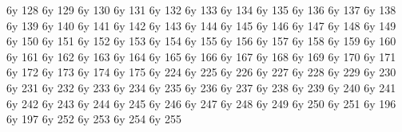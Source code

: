 \characterdef \CYRA           6y  128
\characterdef \CYRB           6y  129
\characterdef \CYRV           6y  130
\characterdef \CYRG           6y  131
\characterdef \CYRD           6y  132
\characterdef \CYRE           6y  133
\characterdef \CYRZH          6y  134
\characterdef \CYRZ           6y  135
\characterdef \CYRI           6y  136
\characterdef \CYRISHRT       6y  137
\characterdef \CYRK           6y  138
\characterdef \CYRL           6y  139
\characterdef \CYRM           6y  140
\characterdef \CYRN           6y  141
\characterdef \CYRO           6y  142
\characterdef \CYRP           6y  143
\characterdef \CYRR           6y  144
\characterdef \CYRS           6y  145
\characterdef \CYRT           6y  146
\characterdef \CYRU           6y  147
\characterdef \CYRF           6y  148
\characterdef \CYRH           6y  149
\characterdef \CYRC           6y  150
\characterdef \CYRCH          6y  151
\characterdef \CYRSH          6y  152
\characterdef \CYRSHCH        6y  153
\characterdef \CYRHRDSN       6y  154
\characterdef \CYRERY         6y  155
\characterdef \CYRSFTSN       6y  156
\characterdef \CYREREV        6y  157
\characterdef \CYRYU          6y  158
\characterdef \CYRYA          6y  159
\characterdef \cyra           6y  160
\characterdef \cyrb           6y  161
\characterdef \cyrv           6y  162
\characterdef \cyrg           6y  163
\characterdef \cyrd           6y  164
\characterdef \cyre           6y  165
\characterdef \cyrzh          6y  166
\characterdef \cyrz           6y  167
\characterdef \cyri           6y  168
\characterdef \cyrishrt       6y  169
\characterdef \cyrk           6y  170
\characterdef \cyrl           6y  171
\characterdef \cyrm           6y  172
\characterdef \cyrn           6y  173
\characterdef \cyro           6y  174
\characterdef \cyrp           6y  175
\characterdef \cyrr           6y  224
\characterdef \cyrs           6y  225
\characterdef \cyrt           6y  226
\characterdef \cyru           6y  227
\characterdef \cyrf           6y  228
\characterdef \cyrh           6y  229
\characterdef \cyrc           6y  230
\characterdef \cyrch          6y  231
\characterdef \cyrsh          6y  232
\characterdef \cyrshch        6y  233
\characterdef \cyrhrdsn       6y  234
\characterdef \cyrery         6y  235
\characterdef \cyrsftsn       6y  236
\characterdef \cyrerev        6y  237
\characterdef \cyryu          6y  238
\characterdef \cyrya          6y  239
\characterdef \CYRYO          6y  240
\characterdef \cyryo          6y  241
\characterdef \CYRGUP         6y  242
\characterdef \cyrgup         6y  243
\characterdef \CYRIE          6y  244
\characterdef \cyrie          6y  245
\characterdef \CYRII          6y  246
\characterdef \cyrii          6y  247
\characterdef \CYRYI          6y  248
\characterdef \cyryi          6y  249
\characterdef \CYRUSHRT       6y  250
\characterdef \cyrushrt       6y  251
\characterdef \cyrdash        6y  196
\characterdef \textcurrency   6y  197
\characterdef \textnumero     6y  252
\characterdef \guillemotleft  6y  253
\characterdef \guillemotright 6y  254
\characterdef \quotedblbase   6y  255


